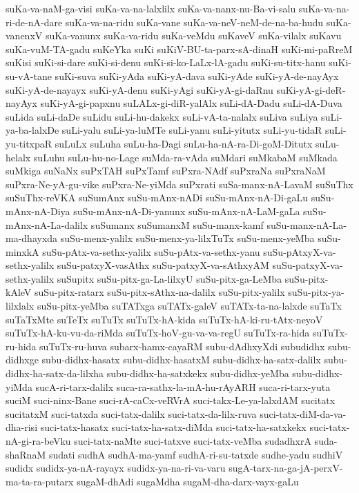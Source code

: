 {suKa-va-naM-ga-visi
suKa-va-na-lalxlilx
suKa-va-nanx-nu-Ba-vi-salu
suKa-va-na-ri-de-nA-dare
suKa-va-na-ridu
suKa-vane
suKa-va-neV-neM-de-na-ba-hudu
suKa-vanenxV
suKa-vanunx
suKa-va-ridu
suKa-veMdu
suKaveV
suKa-vilalx
suKavu
suKa-vuM-TA-gadu
suKeYka
suKi
suKiV-BU-ta-parx-sA-dinaH
suKi-mi-paRreM
suKisi
suKi-si-dare
suKi-si-denu
suKi-si-ko-LaLx-lA-gadu
suKi-su-titx-hanu
suKi-su-vA-tane
suKi-suva
suKi-yAda
suKi-yA-dava
suKi-yAde
suKi-yA-de-nayAyx
suKi-yA-de-nayayx
suKi-yA-denu
suKi-yAgi
suKi-yA-gi-daRnu
suKi-yA-gi-deR-nayAyx
suKi-yA-gi-papxnu
suLALx-gi-diR-yalAlx
suLi-dA-Dadu
suLi-dA-Duva
suLida
suLi-daDe
suLidu
suLi-hu-dakekx
suLi-vA-ta-nalalx
suLiva
suLiya
suLi-ya-ba-lalxDe
suLi-yalu
suLi-ya-luMTe
suLi-yanu
suLi-yitutx
suLi-yu-tidaR
suLi-yu-titxpaR
suLuLx
suLuha
suLu-ha-Dagi
suLu-ha-nA-ra-Di-goM-Ditutx
suLu-helalx
suLuhu
suLu-hu-no-Lage
suMda-ra-vAda
suMdari
suMkabaM
suMkada
suMkiga
suNaNx
suPxTAH
suPxTamf
suPxra-NAdf
suPxraNa
suPxraNaM
suPxra-Ne-yA-gu-vike
suPxra-Ne-yiMda
suPxrati
suSa-manx-nA-LavaM
suSuThx
suSuThx-reVKA
suSumAnx
suSu-mAnx-nADi
suSu-mAnx-nA-Di-gaLu
suSu-mAnx-nA-Diya
suSu-mAnx-nA-Di-yanunx
suSu-mAnx-nA-LaM-gaLa
suSu-mAnx-nA-La-dalilx
suSumanx
suSumanxM
suSu-manx-kamf
suSu-manx-nA-La-ma-dhayxda
suSu-menx-yalilx
suSu-menx-ya-lilxTuTx
suSu-menx-yeMba
suSu-minxkA
suSu-pAtx-va-sethx-yalilx
suSu-pAtx-va-sethx-yanu
suSu-pAtxyX-va-sethx-yalilx
suSu-patxyX-vasAthx
suSu-patxyX-va-sAthxyAM
suSu-patxyX-va-sethx-yalilx
suSupitx
suSu-pitx-ga-La-lilxyU
suSu-pitx-ga-LeMba
suSu-pitx-kAleV
suSu-pitx-ratarx
suSu-pitx-sAthx-na-dalilx
suSu-pitx-yalilx
suSu-pitx-ya-lilxlalx
suSu-pitx-yeMba
suTATxga
suTATx-galeV
suTATx-ta-na-lalxde
suTaTx
suTaTxMte
suTeTx
suTuTx
suTuTx-hA-kida
suTuTx-hA-ki-ru-tAtx-neyoV
suTuTx-hA-ku-vu-da-riMda
suTuTx-hoV-gu-va-va-regU
suTuTx-ra-hida
suTuTx-ru-hida
suTuTx-ru-huva
subarx-hamx-cayaRM
subu-dAdhxyXdi
subudidhx
subu-didhxge
subu-didhx-hasatx
subu-didhx-hasatxM
subu-didhx-ha-satx-dalilx
subu-didhx-ha-satx-da-lilxha
subu-didhx-ha-satxkekx
subu-didhx-yeMba
subu-didhx-yiMda
sucA-ri-tarx-dalilx
suca-ra-sathx-la-mA-hu-rAyARH
suca-ri-tarx-yuta
suciM
suci-ninx-Bane
suci-rA-caCx-veRVrA
suci-takx-Le-ya-lalxdAM
sucitatx
sucitatxM
suci-tatxda
suci-tatx-dalilx
suci-tatx-da-lilx-ruva
suci-tatx-diM-da-va-dha-risi
suci-tatx-hasatx
suci-tatx-ha-satx-diMda
suci-tatx-ha-satxkekx
suci-tatx-nA-gi-ra-beVku
suci-tatx-naMte
suci-tatxve
suci-tatx-veMba
sudadhxrA
suda-shaRnaM
sudati
sudhA
sudhA-ma-yamf
sudhA-ri-su-tatxde
sudhe-yadu
sudhiV
sudidx
sudidx-ya-nA-rayayx
sudidx-ya-na-ri-va-varu
sugA-tarx-na-ga-jA-perxV-ma-ta-ra-putarx
sugaM-dhAdi
sugaMdha
sugaM-dha-darx-vayx-gaLu
}
